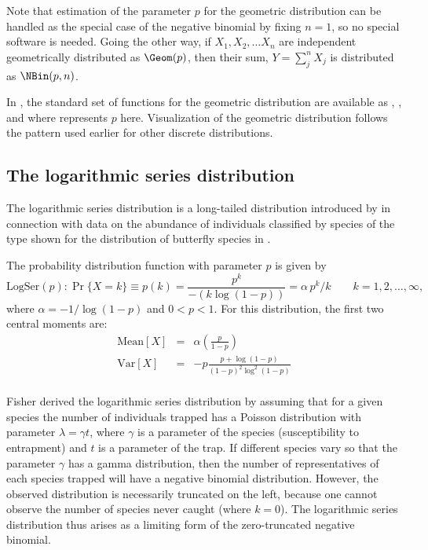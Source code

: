 \documentclass[11pt]{book}\usepackage[]{graphicx}\usepackage[]{color}
\begin{document}
Note that estimation of the parameter $p$ for the geometric distribution
can be handled as the special case of the negative binomial by fixing $n=1$,
so no special software is needed.
Going the other way, if $X_1, X_2, \dots X_n$ are independent geometrically
distributed as $\Geom(p)$, then their sum, $Y = \sum_j^n X_j$ is distributed
as $\NBin(p, n)$.

In \R, the standard set of functions for the geometric distribution are
available as 
,
,
 and
 where  represents $p$ here.
Visualization of the geometric distribution follows the pattern used earlier
for other discrete distributions.


\subsection{The logarithmic series distribution}
The logarithmic series distribution is a long-tailed distribution
introduced by
\citet{Fisher-etal:43}
in connection with data on the abundance of individuals
classified by species of the type shown for the distribution of butterfly
species
in .

The probability distribution function with parameter $p$ is given by
\begin{equation}\label{eq:logseriesf}
\textrm{LogSer}(p): \Pr \{ X = k \} \equiv p ( k )  =
\frac{p^k}{-(k\log (1-p ))} =
\alpha \, p^k / k
\quad\quad k = 1, 2, \dots, \infty
\comma
\end{equation}
where $\alpha = -1 / \log(1 - p)$
and $0 < p <1$.
For this distribution, the first two central moments are:
\begin{eqnarray*}
\textrm{Mean}[X] & = & \alpha \left(\frac{p}{1-p}\right)\\
\textrm{Var}[X] &  = & -p \frac{p + \log(1-p)}{(1-p)^2 \log^2(1-p)}\\
\end{eqnarray*}


Fisher derived the logarithmic series distribution by assuming that
for a given species the number of individuals trapped has a Poisson
distribution with parameter $\lambda = \gamma t$, where
$\gamma$ is a parameter of the species (susceptibility to entrapment)
and $t$ is a parameter of the trap.
If different species vary so that the parameter $\gamma$ has a gamma
distribution, then the number of representatives of each species trapped
will have a negative binomial distribution.
However, the observed distribution is necessarily truncated on the left,
because one cannot observe the number of species never caught (where $k=0$).
The logarithmic series distribution thus arises as a limiting form of the
zero-truncated negative binomial.
\end{document}
